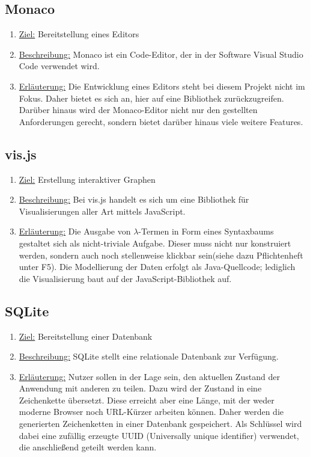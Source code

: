 \documentclass[parskip=full,11pt,twoside]{scrartcl}
\begin{document}
\subsection{Monaco}
\begin{enumerate}
\item \underline{Ziel:} Bereitstellung eines Editors 
\item \underline{Beschreibung:} Monaco ist ein Code-Editor, der in der Software Visual Studio Code verwendet wird.
\item \underline{Erläuterung:} Die Entwicklung eines Editors steht bei diesem Projekt nicht im Fokus. 
Daher bietet es sich an, hier auf eine Bibliothek zurückzugreifen.
Darüber hinaus wird der Monaco-Editor nicht nur den gestellten Anforderungen gerecht, sondern bietet darüber hinaus viele weitere Features.
\end{enumerate}

\subsection{vis.js}
\begin{enumerate}
\item \underline{Ziel:} Erstellung interaktiver Graphen 
\item \underline{Beschreibung:} Bei vis.js handelt es sich um eine Bibliothek für Visualisierungen aller Art mittels JavaScript.
\item \underline{Erläuterung:} Die Ausgabe von $\lambda$-Termen in Form eines Syntaxbaums gestaltet sich als nicht-triviale Aufgabe.
Dieser muss nicht nur konstruiert werden, sondern auch noch stellenweise klickbar sein(siehe dazu Pflichtenheft unter F5).
Die Modellierung der Daten erfolgt als Java-Quellcode; lediglich die Visualisierung baut auf der JavaScript-Bibliothek auf.
\end{enumerate}

\subsection{SQLite}
\begin{enumerate}
\item \underline{Ziel:} Bereitstellung einer Datenbank 
\item \underline{Beschreibung:} SQLite stellt eine relationale Datenbank zur Verfügung.
\item \underline{Erläuterung:} Nutzer sollen in der Lage sein, den aktuellen Zustand der Anwendung mit anderen zu teilen.
Dazu wird der Zustand in eine Zeichenkette übersetzt.
Diese erreicht aber eine Länge, mit der weder moderne Browser noch URL-Kürzer arbeiten können.
Daher werden die generierten Zeichenketten in einer Datenbank gespeichert.
Als Schlüssel wird dabei eine zufällig erzeugte UUID (Universally unique identifier) verwendet, die anschließend geteilt werden kann.
\end{enumerate}
\end{document}
